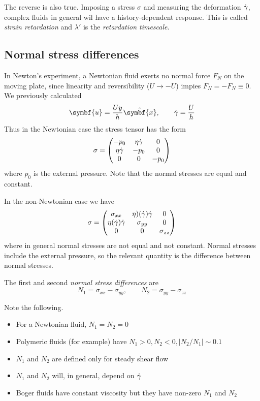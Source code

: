 \documentclass{jknotes}
\begin{document}
The reverse is also true. Imposing a stress $\sigma$ and measuring the
deformation $\dot{\gamma}$, complex fluids in general wil have a
history-dependent response. This is called \emph{strain retardation} and
$\lambda'$ is the \emph{retardation timescale}.

\subsection{Normal stress differences}
In Newton's experiment, a Newtonian fluid exerts no normal force $F_N$ on the moving
plate, since linearity and reversibility ($U \to -U$) impies $F_N = -F_N
\equiv 0$. We previously calculated 
\begin{equation}
	\symbf{u} = \frac{Uy}{h}\hat{\symbf{x}}, \hspace{2em} \srate = \frac{U}{h}
\end{equation}
Thus in the Newtonian case the stress tensor has the form
\begin{equation}
	\sigma = \begin{pmatrix}
		-p_0 & \eta \dot{\gamma} & 0 \\
		\eta \dot{\gamma} & -p_0 & 0 \\
	0 & 0 & -p_0 \end{pmatrix}
\end{equation}
where $p_0$ is the external pressure. Note that the normal stresses are equal
and constant.

In the non-Newtonian case we have
\begin{equation}
	\sigma = \begin{pmatrix}
		\sigma_{xx} & \eta)(\dot{\gamma}) \dot{\gamma} & 0 \\
		\eta(\dot{\gamma}) \dot{\gamma} & \sigma_{yy} & 0 \\
	0 & 0 & \sigma_{zz} \end{pmatrix}
\end{equation}
where in general normal stresses are not equal and not constant. Normal
stresses include the external pressure, so the relevant quantity is the
difference between normal stresses.
\begin{defn}
	The first and second \emph{normal stress differences} are
	\begin{equation}
		N_1 = \sigma_{xx} - \sigma_{yy}, \hspace{2em} N_2 = \sigma_{yy} -
		\sigma_{zz}
	\end{equation}
\end{defn}

Note the following.
\begin{itemize}
	\item For a Newtonian fluid, $N_1 = N_2 = 0$
	\item Polymeric fluids (for example) have $N_1 > 0, N_2 < 0, \left|
		N_2/N_1 \right| \sim 0.1$
	\item $N_1$ and $N_2$ are defined only for steady shear flow
	\item $N_1$ and $N_2$ will, in general, depend on $\dot{\gamma}$
	\item Boger fluids have constant viscosity but they have non-zero $N_1$
		and $N_2$
\end{itemize}
\end{document}
